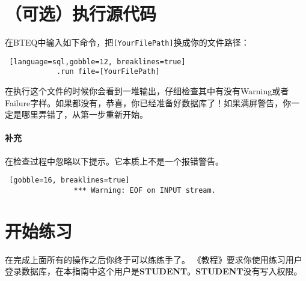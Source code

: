 \documentclass{article}
\begin{document}
		

	\section{（可选）执行源代码} %
		
		 \par

		\bigskip
	



		在BTEQ中输入如下命令，把\lstinline|[YourFilePath]|换成你的文件路径：

		\begin{lstlisting} [language=sql,gobble=12, breaklines=true]
			.run file=[YourFilePath]
		\end{lstlisting}

		在执行这个文件的时候你会看到一堆输出，仔细检查其中有没有Warning或者Failure字样。如果都没有，恭喜，你已经准备好数据库了！如果满屏警告，你一定是哪里弄错了，从第一步重新开始。

		\paragraph{补充}
			在检查过程中忽略以下提示。它本质上不是一个报错警告。

			\begin{lstlisting} [gobble=16, breaklines=true]
				*** Warning: EOF on INPUT stream.
			\end{lstlisting}


	\section{开始练习} %
		在完成上面所有的操作之后你终于可以练练手了。
		 《教程》要求你使用练习用户登录数据库，在本指南中这个用户是\textbf{STUDENT}。\textbf{STUDENT}没有写入权限。
\end{document}
